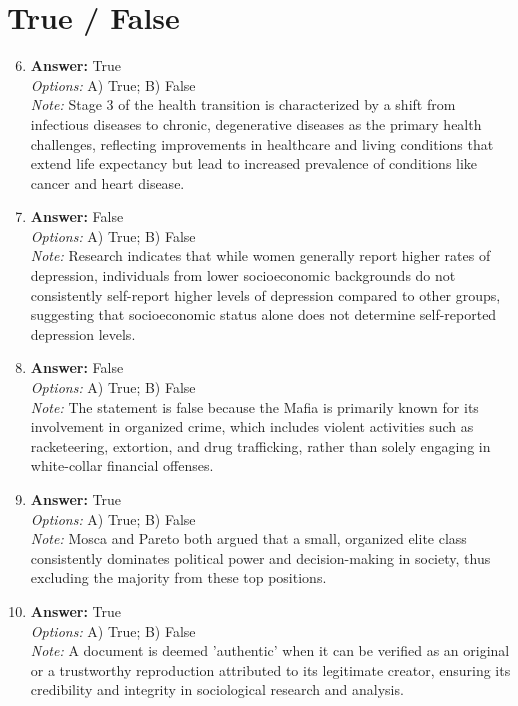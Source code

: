 \documentclass[12pt]{article}
\begin{document}
\section*{True / False}
\begin{enumerate}[label=\arabic*.]
\setcounter{enumi}{5}
\item \textbf{Answer:} True
\\ \textit{Options:} A) True; B) False
\\ \textit{Note:} Stage 3 of the health transition is characterized by a shift from infectious diseases to chronic, degenerative diseases as the primary health challenges, reflecting improvements in healthcare and living conditions that extend life expectancy but lead to increased prevalence of conditions like cancer and heart disease.
\item \textbf{Answer:} False
\\ \textit{Options:} A) True; B) False
\\ \textit{Note:} Research indicates that while women generally report higher rates of depression, individuals from lower socioeconomic backgrounds do not consistently self-report higher levels of depression compared to other groups, suggesting that socioeconomic status alone does not determine self-reported depression levels.
\item \textbf{Answer:} False
\\ \textit{Options:} A) True; B) False
\\ \textit{Note:} The statement is false because the Mafia is primarily known for its involvement in organized crime, which includes violent activities such as racketeering, extortion, and drug trafficking, rather than solely engaging in white-collar financial offenses.
\item \textbf{Answer:} True
\\ \textit{Options:} A) True; B) False
\\ \textit{Note:} Mosca and Pareto both argued that a small, organized elite class consistently dominates political power and decision-making in society, thus excluding the majority from these top positions.
\item \textbf{Answer:} True
\\ \textit{Options:} A) True; B) False
\\ \textit{Note:} A document is deemed 'authentic' when it can be verified as an original or a trustworthy reproduction attributed to its legitimate creator, ensuring its credibility and integrity in sociological research and analysis.
\end{enumerate}
\end{document}
